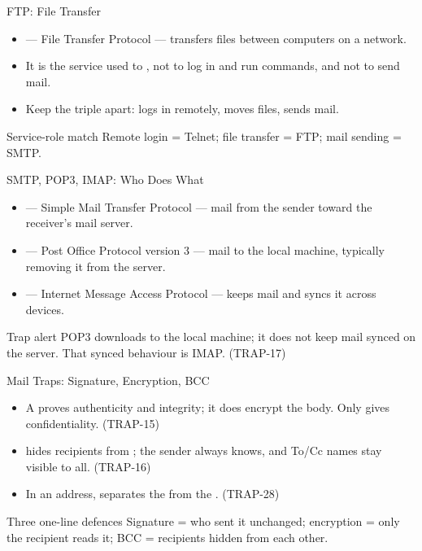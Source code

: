 \documentclass[aspectratio=169]{beamer}
\begin{document}
\begin{frame}{FTP: File Transfer}
  \begin{itemize}
    \item {} --- File Transfer Protocol --- transfers files between
      computers on a network.
    \item It is the service used to , not to
      log in and run commands, and not to send mail.
    \item Keep the triple apart:  logs in remotely, 
      moves files,  sends mail.
  \end{itemize}
  \begin{block}{Service-role match}
    Remote login = Telnet; file transfer = FTP; mail sending = SMTP.
  \end{block}
\end{frame}

\begin{frame}{SMTP, POP3, IMAP: Who Does What}
  \begin{itemize}
    \item {} --- Simple Mail Transfer Protocol ---  mail
      from the sender toward the receiver's mail server.
    \item {} --- Post Office Protocol version 3 --- 
      mail to the local machine, typically removing it from the server.
    \item {} --- Internet Message Access Protocol --- keeps mail
       and syncs it across devices.
  \end{itemize}
  \begin{alertblock}{Trap alert}
    POP3 downloads to the local machine; it does not keep mail synced on
    the server. That synced behaviour is IMAP. (TRAP-17)
  \end{alertblock}
\end{frame}

\begin{frame}{Mail Traps: Signature, Encryption, BCC}
  \begin{itemize}
    \item A  proves authenticity and integrity; it
      does  encrypt the body. Only  gives
      confidentiality. (TRAP-15)
    \item {} hides recipients from ; the sender
      always knows, and To/Cc names stay visible to all. (TRAP-16)
    \item In an address,  separates the  from the
      . (TRAP-28)
  \end{itemize}
  \begin{block}{Three one-line defences}
    Signature = who sent it unchanged; encryption = only the recipient reads
    it; BCC = recipients hidden from each other.
  \end{block}
\end{frame}
\end{document}
